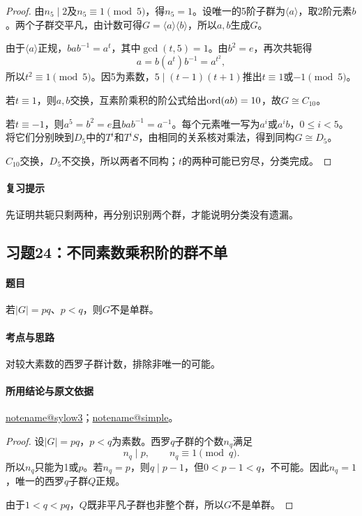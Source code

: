 \documentclass[UTF8,a4paper,11pt,fontset=windows]{ctexart}
\makeatletter
\newcommand{\noteref}[1]{\hyperref[note:#1]{\csname notename@#1\endcsname}}
\newcommand{\exref}[2]{\hyperref[ex:#1:#2]{第#1章习题#2}}
\makeatother
\begin{document}
\begin{proof}
由$n_5\mid2$及$n_5\equiv1\pmod5$，得$n_5=1$。设唯一的5阶子群为$\langle a\rangle$，取2阶元素$b$。两个子群交平凡，由计数可得$G=\langle a\rangle\langle b\rangle$，所以$a,b$生成$G$。

由于$\langle a\rangle$正规，$bab^{-1}=a^t$，其中$\gcd(t,5)=1$。由$b^2=e$，再次共轭得
\[
a=b(a^t)b^{-1}=a^{t^2},
\]
所以$t^2\equiv1\pmod5$。因5为素数，$5\mid(t-1)(t+1)$推出$t\equiv1$或$-1\pmod5$。

若$t\equiv1$，则$a,b$交换，互素阶乘积的阶公式给出$\operatorname{ord}(ab)=10$，故$G\cong C_{10}$。

若$t\equiv-1$，则$a^5=b^2=e$且$bab^{-1}=a^{-1}$。每个元素唯一写为$a^i$或$a^ib$，$0\leq i<5$。将它们分别映到$D_5$中的$T^i$和$T^iS$，由相同的关系核对乘法，得到同构$G\cong D_5$。

$C_{10}$交换，$D_5$不交换，所以两者不同构；$t$的两种可能已穷尽，分类完成。
\end{proof}

\paragraph{复习提示}
先证明共轭只剩两种，再分别识别两个群，才能说明分类没有遗漏。


\subsection{习题24：\texorpdfstring{不同素数乘积阶的群不单}{不同素数乘积阶的群不单}}
\label{ex:2:24}

\paragraph{题目}
若$|G|=pq$、$p<q$，则$G$不是单群。

\paragraph{考点与思路}
对较大素数的西罗子群计数，排除非唯一的可能。

\paragraph{所用结论与原文依据}
\noteref{sylow3}；\noteref{simple}。


\begin{proof}
设$|G|=pq$，$p<q$为素数。西罗$q$子群的个数$n_q$满足
\[
n_q\mid p,\qquad n_q\equiv1\pmod q.
\]
所以$n_q$只能为1或$p$。若$n_q=p$，则$q\mid p-1$，但$0<p-1<q$，不可能。因此$n_q=1$，唯一的西罗$q$子群$Q$正规。

由于$1<q<pq$，$Q$既非平凡子群也非整个群，所以$G$不是单群。
\end{proof}
\end{document}

